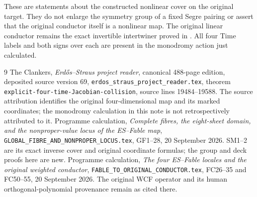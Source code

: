 \documentclass[11pt]{article}
\begin{document}
These are statements about the constructed nonlinear cover on
the original target. They do not enlarge the symmetry group
of a fixed Segre pairing or assert that the original conductor
itself is a nonlinear map. The original linear conductor
remains the exact invertible intertwiner proved in
\cite{Bridge}. All four Time labels and both signs over each
are present in the monodromy action just calculated.

\begin{thebibliography}{9}
 The Clankers, \emph{Erd\H{o}s--Straus project reader},
canonical 488-page edition, deposited source version 69,
\texttt{erdos\_straus\_project\_reader.tex}, theorem
\texttt{explicit-four-time-Jacobian-collision}, source lines
19484--19588. The source attribution identifies the original
four-dimensional map and its marked coordinates; the monodromy
calculation in this note is not retrospectively attributed to it.
 Programme calculation,
\emph{Complete fibres, the eight-sheet domain, and the nonproper-value
locus of the ES--Fable map},
\texttt{GLOBAL\_FIBRE\_AND\_NONPROPER\_LOCUS.tex}, GF1--28,
20 September 2026. SM1--2 are its exact inverse cover and original
coordinate formulas; the group and deck proofs here are new.
 Programme calculation,
\emph{The four ES--Fable locales and the original weighted conductor},
\texttt{FABLE\_TO\_ORIGINAL\_CONDUCTOR.tex}, FC26--35 and FC50--55,
20 September 2026. The original WCF operator and its human
orthogonal-polynomial provenance remain as cited there.
\end{thebibliography}
\end{document}
